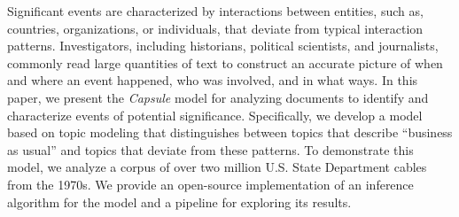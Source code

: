 
Significant events are characterized by interactions between entities,
such as, countries, organizations, or individuals, that deviate from
typical interaction patterns. Investigators, including historians,
political scientists, and journalists, commonly read large quantities
of text to construct an accurate picture of when and where an event
happened, who was involved, and in what ways. In this paper, we
present the \textit{Capsule} model for analyzing documents to identify
and characterize events of potential significance. Specifically, we
develop a model based on topic modeling that distinguishes between
topics that describe ``business as usual'' and topics that deviate
from these patterns. To demonstrate this model, we analyze a corpus of
over two million U.S. State Department cables from the 1970s. We
provide an open-source implementation of an inference algorithm for
the model and a pipeline for exploring its results.

